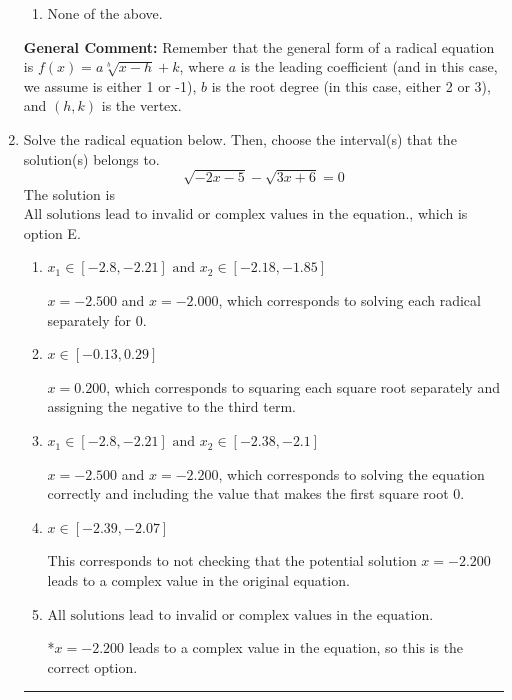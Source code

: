 \documentclass{extbook}[14pt]
\newcommand{\litem}[1]{\item #1

\rule{\textwidth}{0.4pt}}
\begin{document}
\begin{enumerate}
{\begin{enumerate}[label=\Alph*.]
\begin{multicols}{2}
\end{multicols}\item None of the above.\end{enumerate}
\textbf{General Comment:} Remember that the general form of a radical equation is $ f(x) = a \sqrt[b]{x - h} + k $, where $a$ is the leading coefficient (and in this case, we assume is either 1 or -1), $b$ is the root degree (in this case, either 2 or 3), and $(h, k)$ is the vertex.
}
\litem{
Solve the radical equation below. Then, choose the interval(s) that the solution(s) belongs to.
\[ \sqrt{-2 x - 5} - \sqrt{3 x + 6} = 0 \]
The solution is \( \text{All solutions lead to invalid or complex values in the equation.} \), which is option E.\begin{enumerate}[label=\Alph*.]
\item \( x_1 \in [-2.8, -2.21] \text{ and } x_2 \in [-2.18,-1.85] \)

$x = -2.500$ and $x = -2.000$, which corresponds to solving each radical separately for 0.
\item \( x \in [-0.13,0.29] \)

$x = 0.200$, which corresponds to squaring each square root separately and assigning the negative to the third term.
\item \( x_1 \in [-2.8, -2.21] \text{ and } x_2 \in [-2.38,-2.1] \)

$x = -2.500$ and $x = -2.200$, which corresponds to solving the equation correctly and including the value that makes the first square root 0.
\item \( x \in [-2.39,-2.07] \)

This corresponds to not checking that the potential solution $x = -2.200$ leads to a complex value in the original equation.
\item \( \text{All solutions lead to invalid or complex values in the equation.} \)

*$x = -2.200$ leads to a complex value in the equation, so this is the correct option.
\end{enumerate}

}
\end{enumerate}
\end{document}
